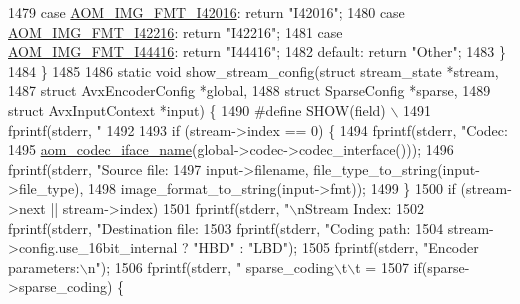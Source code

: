 \begin{DoxyCodeInclude}
{{{{{{{{{{{{{{{{{{{{{{{{1479   \textcolor{keywordflow}{case} \hyperlink{aom__image_8h_a930317c04b4bd0a660bb5e744055523ca20a9cf30277260685642b4cfb4e9273b}{AOM\_IMG\_FMT\_I42016}: \textcolor{keywordflow}{return} \textcolor{stringliteral}{"I42016"};
1480   \textcolor{keywordflow}{case} \hyperlink{aom__image_8h_a930317c04b4bd0a660bb5e744055523ca064683ed4260fc6244af6cfc9d261c22}{AOM\_IMG\_FMT\_I42216}: \textcolor{keywordflow}{return} \textcolor{stringliteral}{"I42216"};
1481   \textcolor{keywordflow}{case} \hyperlink{aom__image_8h_a930317c04b4bd0a660bb5e744055523cab9b93d397dedbdd6bfafec84d1f8f0f5}{AOM\_IMG\_FMT\_I44416}: \textcolor{keywordflow}{return} \textcolor{stringliteral}{"I44416"};
1482   \textcolor{keywordflow}{default}: \textcolor{keywordflow}{return} \textcolor{stringliteral}{"Other"};
1483   \}
1484 \}
1485 
1486 \textcolor{keyword}{static} \textcolor{keywordtype}{void} show\_stream\_config(\textcolor{keyword}{struct} stream\_state *stream,
1487     \textcolor{keyword}{struct} AvxEncoderConfig *global,
1488     \textcolor{keyword}{struct} SparseConfig *sparse,
1489     \textcolor{keyword}{struct} AvxInputContext *input) \{
1490 \textcolor{preprocessor}{#define SHOW(field) \(\backslash\)}
1491 \textcolor{preprocessor}{    fprintf(stderr, "    %
1492 
1493   \textcolor{keywordflow}{if} (stream->index == 0) \{
1494     fprintf(stderr, \textcolor{stringliteral}{"Codec: %
1495         \hyperlink{group__codec_ga013b1f6d96b2cf9489396311a7e5179b}{aom\_codec\_iface\_name}(global->codec->codec\_interface()));
1496     fprintf(stderr, \textcolor{stringliteral}{"Source file: %
1497         input->filename, file\_type\_to\_string(input->file\_type),
1498         image\_format\_to\_string(input->fmt));
1499   \}
1500   \textcolor{keywordflow}{if} (stream->next || stream->index)
1501     fprintf(stderr, \textcolor{stringliteral}{"\(\backslash\)nStream Index: %
1502   fprintf(stderr, \textcolor{stringliteral}{"Destination file: %
1503   fprintf(stderr, \textcolor{stringliteral}{"Coding path: %
1504       stream->config.use\_16bit\_internal ? \textcolor{stringliteral}{"HBD"} : \textcolor{stringliteral}{"LBD"});
1505   fprintf(stderr, \textcolor{stringliteral}{"Encoder parameters:\(\backslash\)n"});
1506   fprintf(stderr, \textcolor{stringliteral}{"    sparse\_coding\(\backslash\)t\(\backslash\)t = %
1507   \textcolor{keywordflow}{if}(sparse->sparse\_coding) \{
}}}}}}}}}}}}}}}}}}}}}}}}}}}}}}}
\end{DoxyCodeInclude}
